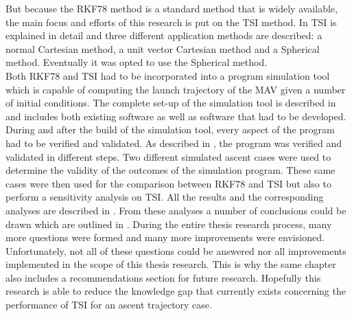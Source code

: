 But because the \ac{RKF78} method is a standard method that is widely available, the main focus and efforts of this research is put on the \ac{TSI} method. In  \ac{TSI} is explained in detail and three different application methods are described: a normal Cartesian method, a unit vector Cartesian method and a Spherical method. Eventually it was opted to use the Spherical method. \\
Both \ac{RKF78} and \ac{TSI} had to be incorporated into a program simulation tool which is capable of computing the launch trajectory of the \ac{MAV} given a number of initial conditions. The complete set-up of the simulation tool is described in  and includes both existing software as well as software that had to be developed. 
During and after the build of the simulation tool, every aspect of the program had to be verified and validated. As described in , the program was verified and validated in different steps. Two different simulated ascent cases were used to determine the validity of the outcomes of the simulation program.
These same cases were then used for the comparison between \ac{RKF78} and \ac{TSI} but also to perform a sensitivity analysis on \ac{TSI}. All the results and the corresponding analyses are described in .
From these analyses a number of conclusions could be drawn which are outlined in . During the entire thesis research process, many more questions were formed and many more improvements were envisioned. Unfortunately, not all of these questions could be answered nor all improvements implemented in the scope of this thesis research. This is why the same chapter also includes a recommendations section for future research. 
Hopefully this research is able to reduce the knowledge gap that currently exists concerning the performance of \ac{TSI} for an ascent trajectory case.





